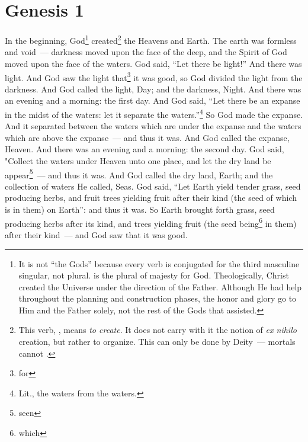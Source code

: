 \section{Genesis 1}\label{Genesis 1}
\begin{enumerate}
     In the beginning, God\footnote{It is not ``the Gods'' because every verb is conjugated for the third masculine singular, not plural.  is the plural of majesty for God. Theologically, Christ created the Universe under the direction of the Father. Although He had help throughout the planning and construction phases, the honor and glory go to Him and the Father solely, not the rest of the Gods that assisted.} created\footnote{This verb, , means \emph{to create}. It does not carry with it the notion of \emph{ex nihilo} creation, but rather to organize. This can only be done by Deity~--- mortals cannot .} the Heavens and Earth.%
     The earth was formless and void~--- darkness moved upon the face of the deep, and the Spirit of God moved upon the face of the waters.%
     God said, ``Let there be light!'' And there was light.%
     And God saw the light that\footnote{for} it was good, so God divided the light from the darkness.%
     And God called the light, Day; and the darkness, Night. And there was an evening and a morning: the first day.%
     And God said, ``Let there be an expanse in the midst of the waters: let it separate the waters.''\footnote{Lit., the waters from the waters.}%
     So God made the expanse. And it separated between the waters which are under the expanse and the waters which are above the expanse~--- and thus it was.%
     And God called the expanse, Heaven. And there was an evening and a morning: the second day.%
     God said, "Collect the waters under Heaven unto one place, and let the dry land be appear\footnote{seen}~--- and thus it was.%
     And God called the dry land, Earth; and the collection of waters He called, Seas.%
     God said, ``Let Earth yield tender grass, seed producing herbs, and fruit trees yielding fruit after their kind (the seed of which is in them) on Earth'': and thus it was.%
     So Earth brought forth grass, seed producing herbs after its kind, and trees yielding fruit (the seed being\footnote{which} in them) after their kind~--- and God saw that it was good.%

\end{enumerate}
